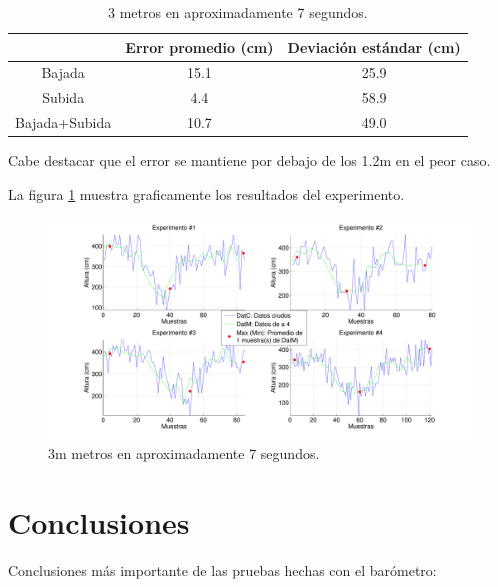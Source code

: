 \documentclass[spanish,12pt,a4paper,titlepage]{report}
\begin{document}
\begin{table}[H]
\centering
\begin{tabular}{c|c|c|} 
\cline{2-3}
  & Error promedio (cm) & Deviación estándar (cm)\\ \hline
\multicolumn{1}{|c|}{Bajada} & 15.1 & 25.9 \\ \hline
\multicolumn{1}{|c|}{Subida} & 4.4 &  58.9 \\ \hline
\multicolumn{1}{|c|}{Bajada+Subida} & 10.7 & 49.0 \\ \hline
\end{tabular}
\caption{3 metros en aproximadamente 7 segundos.}
\label{tab:ruido-rms}
\end{table}

Cabe destacar que el error se mantiene por debajo de los 1.2m en el peor caso.

La figura \ref{fig:estante_veloz.pdf} muestra graficamente los resultados del experimento.

\begin{figure}[H]
\hspace{-90pt}
  \includegraphics[width=1.4\textwidth]{./pics/estante_veloz.pdf}
  \caption{3m metros en aproximadamente 7 segundos.}
  \label{fig:estante_veloz.pdf}
\end{figure}

\newpage
\section{Conclusiones}
\label{sec:conclusiones}

Conclusiones más importante de las pruebas hechas con el barómetro:
\end{document}
